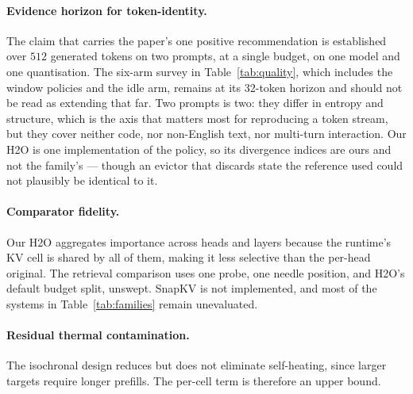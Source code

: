 \documentclass[manuscript,anonymous,review]{acmart}
\begin{document}
\paragraph{Evidence horizon for token-identity.} The claim that
carries the paper's one positive recommendation is established over
$512$ generated tokens on two prompts, at a single budget, on one model
and one quantisation. The six-arm survey in Table~\ref{tab:quality},
which includes the window policies and the idle arm, remains at its
32-token horizon and should not be read as extending that far. Two
prompts is two: they differ in entropy and structure, which is the axis
that matters most for reproducing a token stream, but they cover
neither code, nor non-English text, nor multi-turn interaction. Our H2O
is one implementation of the policy, so its divergence indices are ours
and not the family's --- though an evictor that discards state the
reference used could not plausibly be identical to it.

\paragraph{Comparator fidelity.} Our H2O aggregates importance across
heads and layers because the runtime's KV cell is shared by all of
them, making it less selective than the per-head original. The retrieval
comparison uses one probe, one needle position, and H2O's default
budget split, unswept. SnapKV is not implemented, and most of the
systems in Table~\ref{tab:families} remain unevaluated.

\paragraph{Residual thermal contamination.} The isochronal design
reduces but does not eliminate self-heating, since larger targets
require longer prefills. The per-cell term is therefore an upper
bound.
\end{document}
